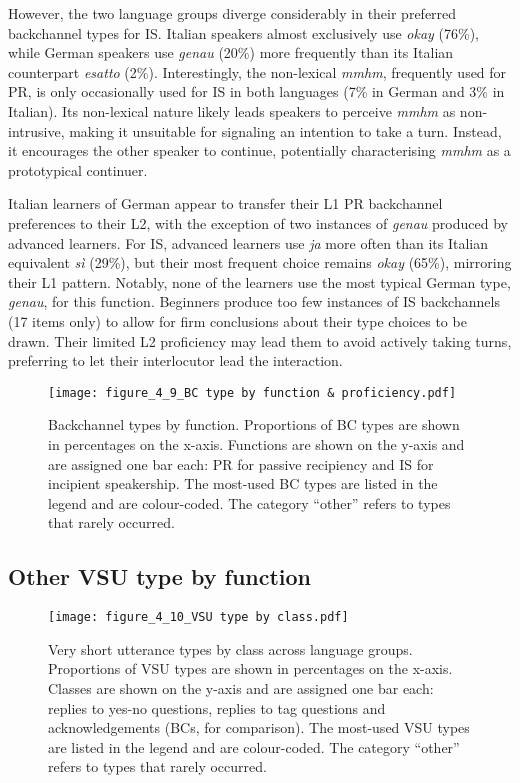 However, the two language groups diverge considerably in their preferred backchannel types for IS. Italian speakers almost exclusively use \textit{okay} (76\%), while German speakers use \textit{genau} (20\%) more frequently than its Italian counterpart \textit{esatto} (2\%). Interestingly, the non-lexical \textit{mmhm}, frequently used for PR, is only occasionally used for IS in both languages (7\% in German and 3\% in Italian). Its non-lexical nature likely leads speakers to perceive \textit{mmhm} as non-intrusive, making it unsuitable for signaling an intention to take a turn. Instead, it encourages the other speaker to continue, potentially characterising \textit{mmhm} as a prototypical continuer. 

Italian learners of German appear to transfer their L1 PR backchannel preferences to their L2, with the exception of two instances of \textit{genau} produced by advanced learners. For IS, advanced learners use \textit{ja} more often than its Italian equivalent \textit{sì} (29\%), but their most frequent choice remains \textit{okay} (65\%), mirroring their L1 pattern. Notably, none of the learners use the most typical German type, \textit{genau}, for this function. Beginners produce too few instances of IS backchannels (17 items only) to allow for firm conclusions about their type choices to be drawn. Their limited L2 proficiency may lead them to avoid actively taking turns, preferring to let their interlocutor lead the interaction. 

\begin{figure}
\texttt{[image: figure\_4\_9\_BC type by function \& proficiency.pdf]}
\caption{Backchannel types by function. Proportions of BC types are shown in percentages on the x-axis. Functions are shown on the y-axis and are assigned one bar each: PR for passive recipiency and IS for incipient speakership. The most-used BC types are listed in the legend and are colour-coded. The category “other” refers to types that rarely occurred.}
\label{fig:4.9}
\end{figure}

\subsection{Other VSU type by function}
\label{sec:4.3.6}
\begin{figure}[b]
\texttt{[image: figure\_4\_10\_VSU type by class.pdf]}
\caption{Very short utterance types by class across language groups. Proportions of VSU types are shown in percentages on the x-axis. Classes are shown on the y-axis and are assigned one bar each: replies to yes-no questions, replies to tag questions and acknowledgements (BCs, for comparison). The most-used VSU types are listed in the legend and are colour-coded. The category “other” refers to types that rarely occurred.}
\label{fig:4.10}
\end{figure}


